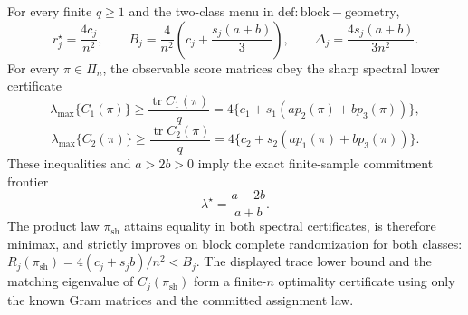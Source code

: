 For every finite \(q\ge1\) and the two-class menu in \(\mathrm{def:block-geometry}\), \[r_j^\star=\frac{4c_j}{n^2},\qquad B_j=\frac{4}{n^2}\left(c_j+\frac{s_j(a+b)}{3}\right),\qquad \Delta_j=\frac{4s_j(a+b)}{3n^2}.\] For every \(\pi\in\Pi_n\), the observable score matrices obey the sharp spectral lower certificate \[\lambda_{\max}\{C_1(\pi)\}\ge\frac{\operatorname{tr}C_1(\pi)}q=4\{c_1+s_1(ap_2(\pi)+bp_3(\pi))\},\] \[\lambda_{\max}\{C_2(\pi)\}\ge\frac{\operatorname{tr}C_2(\pi)}q=4\{c_2+s_2(ap_1(\pi)+bp_3(\pi))\}.\] These inequalities and \(a>2b>0\) imply the exact finite-sample commitment frontier \[\lambda^\star=\frac{a-2b}{a+b}.\] The product law \(\pi_{\mathrm{sh}}\) attains equality in both spectral certificates, is therefore minimax, and strictly improves on block complete randomization for both classes: \(R_j(\pi_{\mathrm{sh}})=4(c_j+s_jb)/n^2<B_j\). The displayed trace lower bound and the matching eigenvalue of \(C_j(\pi_{\mathrm{sh}})\) form a finite-\(n\) optimality certificate using only the known Gram matrices and the committed assignment law.
